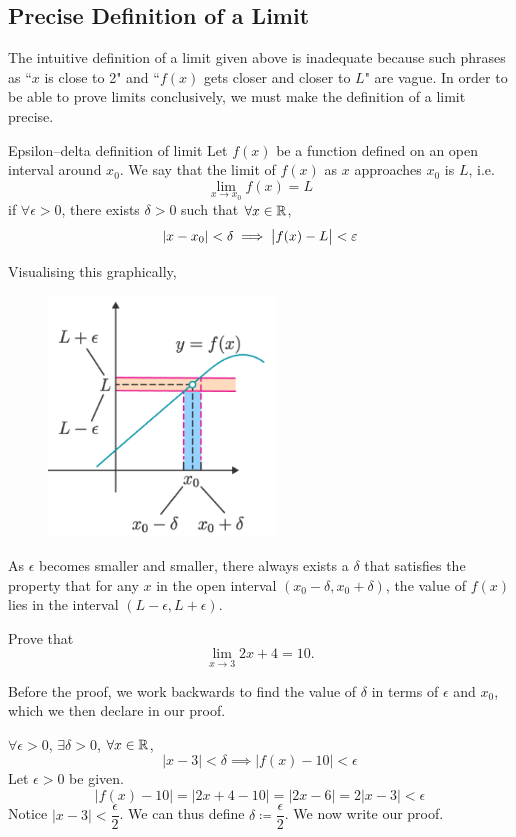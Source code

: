 
\subsection{Precise Definition of a Limit}
The intuitive definition of a limit given above is inadequate because such phrases as ``$x$ is close to 2" and ``$f(x)$ gets closer and closer to $L$" are vague. In order to be able to prove limits conclusively, we must make the definition of a limit precise.

\begin{defn}{Epsilon--delta definition of limit}{}
Let $f(x)$ be a function defined on an open interval around $x_0$. We say that the limit of $f(x)$ as $x$ approaches $x_0$ is $L$, i.e. 
\[ \lim_{x \to x_0} f(x) = L \]
if $\forall \epsilon > 0$, there exists $\delta > 0$ such that $\forall x \in \mathbb R$, 
\[ \left|x-x_0\right|<\delta \implies \left|f(x)-L\right|<\varepsilon \] 
\end{defn} 

Visualising this graphically, 
\begin{figure}[H]
	\centering
	\includegraphics[width=6cm]{images/Epsilon_delta_definition.png}
\end{figure}
As $\epsilon$ becomes smaller and smaller, there always exists a $\delta$ that satisfies the property that for any $x$ in the open interval $(x_0-\delta,x_0+\delta)$, the value of $f(x)$ lies in the interval $(L-\epsilon, L+\epsilon)$.

\begin{exmp}{}{} 
Prove that \[ \lim_{x \to 3} 2x+4 = 10. \] \end{exmp}

Before the proof, we work backwards to find the value of $\delta$ in terms of $\epsilon$ and $x_0$, which we then declare in our proof.

$\forall \epsilon > 0$, $\exists \delta > 0$, $\forall x \in \mathbb R$,
\[ |x-3| < \delta \implies |f(x)-10| < \epsilon \]
Let $\epsilon > 0$ be given.
\[ |f(x)-10| = |2x+4-10| = |2x-6| = 2|x-3| < \epsilon \]
Notice $|x-3| < \dfrac{\epsilon}{2}$. We can thus define $\delta \coloneqq \dfrac{\epsilon}{2}$. We now write our proof.

